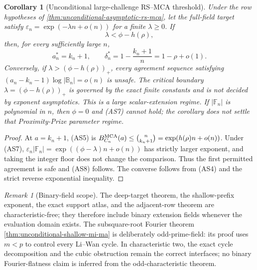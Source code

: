 \documentclass[12pt,a4paper]{amsart}
\numberwithin{equation}{section}
\newtheorem{corollary}[corollary]{Corollary}
\theoremstyle{remark}
\newtheorem{remark}[remark]{Remark}
\newcommand{\F}{\mathbb F}
\newcommand{\B}{\mathbb B}
\newcommand{\eps}{\varepsilon}
\newcommand{\abs}[1]{\lvert #1\rvert}
\begin{document}
\begin{corollary}[Unconditional large-challenge RS--MCA threshold]
\label{cor:unconditional-rs-mca-capacity}
Under the row hypotheses of
\cref{thm:unconditional-asymptotic-rs-mca}, let the full-field target
satisfy \(\eps_n=\exp(-\lambda n+o(n))\) for a finite
\(\lambda\ge0\).  If
\[
                         \lambda<\phi-h(\rho),      \tag{AS7}
\]
then, for every sufficiently large \(n\),
\[
 a_n^*=k_n+1,\qquad
 \delta_n^*=1-\frac{k_n+1}{n}=1-\rho+o(1).         \tag{AS8}
\]
Conversely, if \(\lambda>(\phi-h(\rho))_+\), every agreement sequence
satisfying \((a_n-k_n-1)\log\abs{\B_n}=o(n)\) is unsafe.  The critical
boundary \(\lambda=(\phi-h(\rho))_+\) is governed by the
exact finite constants and is not decided by exponent asymptotics.  This
is a large scalar-extension regime.  If \(\abs{\F_n}\) is polynomial in
\(n\), then \(\phi=0\) and \textup{(AS7)} cannot hold; the corollary does
not settle that Proximity-Prize parameter regime.
\end{corollary}

\begin{proof}
At \(a=k_n+1\), \textup{(AS5)} is
\(B_{C_n}^{\rm MCA}(a)\le\binom n{k_n+1}
=\exp(h(\rho)n+o(n))\).  Under \textup{(AS7)},
\(\eps_n\abs{\F_n}=\exp((\phi-\lambda)n+o(n))\) has strictly larger
exponent, and taking the integer floor does not change the comparison.
Thus the first permitted agreement is safe
and \textup{(AS8)} follows.  The converse follows from \textup{(AS4)}
and the strict reverse exponential inequality.
\end{proof}

\begin{remark}[Binary-field scope]
The deep-target theorem, the shallow-prefix exponent, the exact support
atlas, and the adjacent-row theorem are characteristic-free; they therefore
include binary extension fields whenever the evaluation domain exists.
The subsquare-root Fourier theorem
\cref{thm:unconditional-shallow-mi-ma} is deliberately odd-prime-field:
its proof uses \(m<p\) to control every Li--Wan cycle.  In characteristic
two, the exact cycle decomposition and the cubic obstruction remain the
correct interfaces; no binary Fourier-flatness claim is inferred from the
odd-characteristic theorem.
\end{remark}
\end{document}
